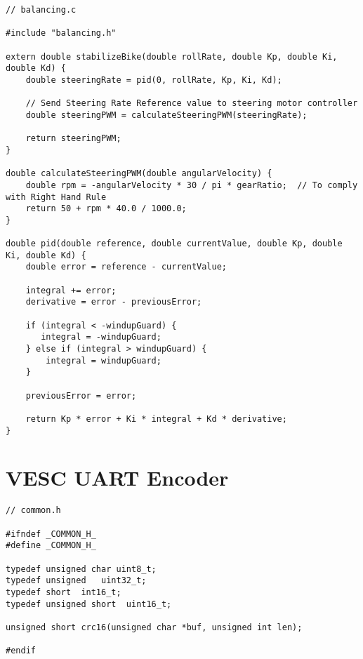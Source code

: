 \begin{lstlisting}
// balancing.c

#include "balancing.h"

extern double stabilizeBike(double rollRate, double Kp, double Ki, double Kd) {
    double steeringRate = pid(0, rollRate, Kp, Ki, Kd);

    // Send Steering Rate Reference value to steering motor controller
    double steeringPWM = calculateSteeringPWM(steeringRate);

    return steeringPWM;
}

double calculateSteeringPWM(double angularVelocity) {
    double rpm = -angularVelocity * 30 / pi * gearRatio;  // To comply with Right Hand Rule
    return 50 + rpm * 40.0 / 1000.0;
}

double pid(double reference, double currentValue, double Kp, double Ki, double Kd) {
    double error = reference - currentValue;

    integral += error;
    derivative = error - previousError;

    if (integral < -windupGuard) {
       integral = -windupGuard;
    } else if (integral > windupGuard) {
        integral = windupGuard;
    }

    previousError = error;

    return Kp * error + Ki * integral + Kd * derivative;
}
\end{lstlisting}

\section{VESC UART Encoder}

\begin{lstlisting}
// common.h

#ifndef _COMMON_H_
#define _COMMON_H_

typedef unsigned char uint8_t;
typedef unsigned   uint32_t;
typedef short  int16_t;
typedef unsigned short  uint16_t;

unsigned short crc16(unsigned char *buf, unsigned int len);

#endif
\end{lstlisting}

